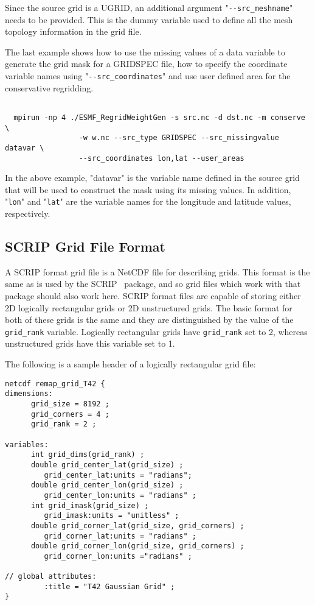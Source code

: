 Since the source grid is a UGRID, an additional argument "{\tt \verb+--+src\_meshname}" needs to be provided.  This is the dummy variable used to define all the mesh topology information in the
grid file.

The last example shows how to use the missing values of a data variable to generate the
grid mask for a GRIDSPEC file, how to specify the coordinate variable names
using "{\tt \verb+--+src\_coordinates}"
 and use user defined area for the conservative regridding.

\begin{verbatim}

  mpirun -np 4 ./ESMF_RegridWeightGen -s src.nc -d dst.nc -m conserve \
                 -w w.nc --src_type GRIDSPEC --src_missingvalue datavar \
                 --src_coordinates lon,lat --user_areas

\end{verbatim}

In the above example, "datavar" is the variable name defined in the source grid that will
 be used to construct the mask using its missing values.  In addition, "{\tt lon}" and "{\tt lat}" are the
variable names for the longitude and latitude values, respectively.

\subsection{SCRIP Grid File Format}\label{sec:fileformat:scrip}

A SCRIP format grid file is a NetCDF file for describing grids. This format is the same as is used by the SCRIP~\cite{ref:SCRIP}
package, and so grid files which work with that package should also work here.  SCRIP format files are capable of storing either 2D logically rectangular
grids or 2D unstructured grids. The basic format for both of these grids is the same and they are distinguished by the
value of the {\tt grid\_rank} variable. Logically rectangular grids have {\tt grid\_rank} set to 2,
whereas unstructured grids have this variable set to 1.

The following is a sample header of a logically rectangular grid file:

\begin{verbatim}
netcdf remap_grid_T42 {
dimensions:
      grid_size = 8192 ;
      grid_corners = 4 ;
      grid_rank = 2 ;

variables:
      int grid_dims(grid_rank) ;
      double grid_center_lat(grid_size) ;
         grid_center_lat:units = "radians";
      double grid_center_lon(grid_size) ;
         grid_center_lon:units = "radians" ;
      int grid_imask(grid_size) ;
         grid_imask:units = "unitless" ;
      double grid_corner_lat(grid_size, grid_corners) ;
         grid_corner_lat:units = "radians" ;
      double grid_corner_lon(grid_size, grid_corners) ;
         grid_corner_lon:units ="radians" ;

// global attributes:
         :title = "T42 Gaussian Grid" ;
}
\end{verbatim}

